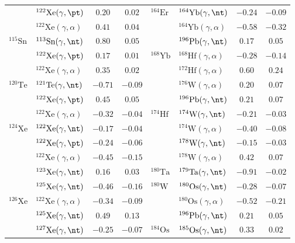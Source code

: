 {\begin{longtable}{llcc llcc}
$ $ & $^{122}\mathrm{Xe}(\gamma,\pt)$ & $0.20$ & $0.02$ & $^{164}\mathrm{Er}$ & $^{164}\mathrm{Yb}(\gamma,\nt)$ & $-0.24$ & $-0.09$ \\ 
$ $ & $^{122}\mathrm{Xe}(\gamma,\alpha)$ & $0.41$ & $0.04$ & $ $ & $^{164}\mathrm{Yb}(\gamma,\alpha)$ & $-0.58$ & $-0.32$ \\ 
$^{115}\mathrm{Sn}$ & $^{113}\mathrm{Sn}(\gamma,\nt)$ & $0.80$ & $0.05$ & $ $ & $^{196}\mathrm{Pb}(\gamma,\nt)$ & $0.17$ & $0.05$ \\ 
$ $ & $^{122}\mathrm{Xe}(\gamma,\pt)$ & $0.17$ & $0.01$ & $^{168}\mathrm{Yb}$ & $^{168}\mathrm{Hf}(\gamma,\alpha)$ & $-0.28$ & $-0.14$ \\ 
$ $ & $^{122}\mathrm{Xe}(\gamma,\alpha)$ & $0.35$ & $0.02$ & $ $ & $^{172}\mathrm{Hf}(\gamma,\alpha)$ & $0.60$ & $0.24$ \\ 
$^{120}\mathrm{Te}$ & $^{121}\mathrm{Te}(\gamma,\nt)$ & $-0.71$ & $-0.09$ & $ $ & $^{176}\mathrm{W}(\gamma,\alpha)$ & $0.20$ & $0.07$ \\ 
$ $ & $^{122}\mathrm{Xe}(\gamma,\pt)$ & $0.45$ & $0.05$ & $ $ & $^{196}\mathrm{Pb}(\gamma,\nt)$ & $0.21$ & $0.07$ \\ 
$ $ & $^{122}\mathrm{Xe}(\gamma,\alpha)$ & $-0.32$ & $-0.04$ & $^{174}\mathrm{Hf}$ & $^{174}\mathrm{W}(\gamma,\nt)$ & $-0.21$ & $-0.03$ \\ 
$^{124}\mathrm{Xe}$ & $^{122}\mathrm{Xe}(\gamma,\nt)$ & $-0.17$ & $-0.04$ & $ $ & $^{174}\mathrm{W}(\gamma,\alpha)$ & $-0.40$ & $-0.08$ \\ 
$ $ & $^{122}\mathrm{Xe}(\gamma,\pt)$ & $-0.24$ & $-0.06$ & $ $ & $^{178}\mathrm{W}(\gamma,\nt)$ & $-0.15$ & $-0.03$ \\ 
$ $ & $^{122}\mathrm{Xe}(\gamma,\alpha)$ & $-0.45$ & $-0.15$ & $ $ & $^{178}\mathrm{W}(\gamma,\alpha)$ & $0.42$ & $0.07$ \\ 
$ $ & $^{123}\mathrm{Xe}(\gamma,\nt)$ & $0.16$ & $0.03$ & $^{180}\mathrm{Ta}$ & $^{179}\mathrm{Ta}(\gamma,\nt)$ & $-0.91$ & $-0.02$ \\ 
$ $ & $^{125}\mathrm{Xe}(\gamma,\nt)$ & $-0.46$ & $-0.16$ & $^{180}\mathrm{W}$ & $^{180}\mathrm{Os}(\gamma,\nt)$ & $-0.28$ & $-0.07$ \\ 
$^{126}\mathrm{Xe}$ & $^{122}\mathrm{Xe}(\gamma,\alpha)$ & $-0.34$ & $-0.09$ & $ $ & $^{180}\mathrm{Os}(\gamma,\alpha)$ & $-0.52$ & $-0.21$ \\ 
$ $ & $^{125}\mathrm{Xe}(\gamma,\nt)$ & $0.49$ & $0.13$ & $ $ & $^{196}\mathrm{Pb}(\gamma,\nt)$ & $0.21$ & $0.05$ \\ 
$ $ & $^{127}\mathrm{Xe}(\gamma,\nt)$ & $-0.25$ & $-0.07$ & $^{184}\mathrm{Os}$ & $^{185}\mathrm{Os}(\gamma,\nt)$ & $0.33$ & $0.02$ \\ 

\end{longtable}}
